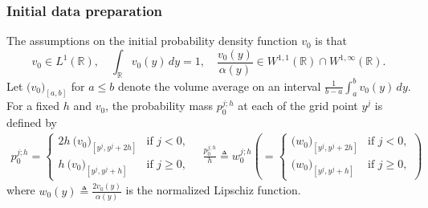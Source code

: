 \documentclass[a4paper,11pt]{article}
\theoremstyle{remark}
\begin{document}
\subsubsection{Initial data preparation}
The assumptions on the initial probability density function $v_0$ is that
\begin{equation} \label{initial}
 v_0 \in L^1( \mathbb{R}), \quad \int_ \mathbb{R} v_0(y)\, dy = 1, \quad \frac{v_0(y)}{\alpha(y)} \in W^{1,1}(\mathbb{R})\cap W^{1,\infty}(\mathbb{R}).
\end{equation}
Let $\big(v_0\big)_{[a,b]}$ for $a\le b$ denote the volume average on an interval $\tfrac{1}{b-a}\int_a^b v_0(y)\, dy$. For a fixed $h$ and $v_0$, the probability mass $p_{0}^{j;h}$  at each of the grid point $y^j$ is defined by
\begin{equation} \label{vol_aver+pmf}
 \begin{aligned}
 p_{0}^{j;h} = \left\{\begin{array}{ll}
                2h~\big(v_0\big)_{[y^j,y^{j}+2h]} & \text{if } j<0,\\
                h~\big(v_0\big)_{[y^j,y^j +h]} & \text{if } j\ge0,
               \end{array}\right.
 \quad \frac{p_{0}^{j;h}}{h}\triangleq w_{0}^{j;h} \left(= \left\{\begin{array}{ll}
                \big(w_0\big)_{[y^j,y^{j}+2h]} & \text{if } j<0,\\
                \big(w_0\big)_{[y^j,y^j +h]} & \text{if } j\ge0,
               \end{array}\right.\right)
 \end{aligned}
\end{equation}
where $w_0(y)\triangleq \frac{2v_0(y)}{\alpha(y)}$ is the normalized Lipschiz function. 
\end{document}
